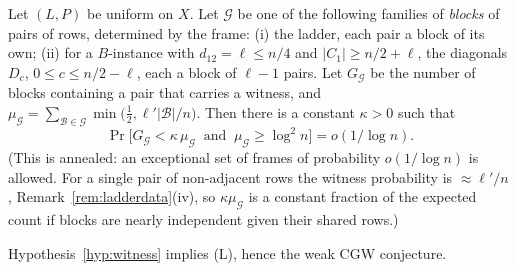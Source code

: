 \begin{hypothesis}\label{hyp:witness}
Let $(L,P)$ be uniform on $X$.  Let $\mathcal G$ be one of the
following families of \emph{blocks} of pairs of rows, determined by
the frame: (i) the ladder, each pair a block of its own; (ii) for a
$B$-instance with $d_{12}=\ell\le n/4$ and $|C_1|\ge n/2+\ell$, the
diagonals $D_c$, $0\le c\le n/2-\ell$, each a block of $\ell-1$ pairs.
Let $G_{\mathcal G}$ be the number of blocks containing a pair that
carries a witness, and
$\mu_{\mathcal G}=\sum_{\mathcal B\in\mathcal G}\min\bigl(\tfrac12,\ell'|\mathcal B|/n\bigr)$.
Then there is a constant $\kappa>0$ such that
\[
\Pr\bigl[G_{\mathcal G}<\kappa\,\mu_{\mathcal G}\ \text{ and }\ \mu_{\mathcal G}\ge\log^2n\bigr]=o(1/\log n).
\]
(This is annealed: an exceptional set of frames of probability
$o(1/\log n)$ is allowed.  For a single pair of non-adjacent rows the
witness probability is $\approx\ell'/n$, Remark~\ref{rem:ladderdata}(iv),
so $\kappa\mu_{\mathcal G}$ is a constant fraction of the expected
count if blocks are nearly independent given their shared rows.)
\end{hypothesis}

\begin{proposition}\label{prop:Lwitness}
Hypothesis~\ref{hyp:witness} implies \textup{(L)}, hence the weak CGW
conjecture.
\end{proposition}

